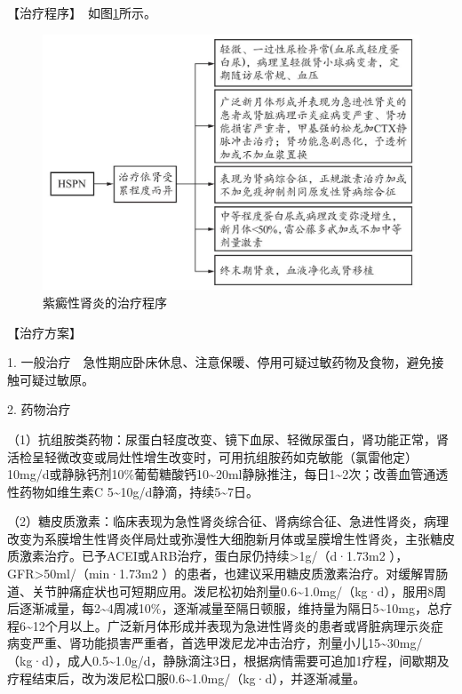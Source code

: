 【治疗程序】　如图\ref{fig4-2-2}所示。

\begin{figure}[!htbp]
 \centering
 \includegraphics{./images/Image00126.jpg}
 \captionsetup{justification=centering}
 \caption{紫癜性肾炎的治疗程序}
 \label{fig4-2-2}
  \end{figure} 

【治疗方案】

1.
一般治疗　急性期应卧床休息、注意保暖、停用可疑过敏药物及食物，避免接触可疑过敏原。

2. 药物治疗

（1）抗组胺类药物：尿蛋白轻度改变、镜下血尿、轻微尿蛋白，肾功能正常，肾活检呈轻微改变或局灶性增生改变时，可用抗组胺药如克敏能（氯雷他定）10mg/d或静脉钙剂10\%葡萄糖酸钙10\textasciitilde{}20ml静脉推注，每日1\textasciitilde{}2次；改善血管通透性药物如维生素C
5\textasciitilde{}10g/d静滴，持续5\textasciitilde{}7日。

（2）糖皮质激素：临床表现为急性肾炎综合征、肾病综合征、急进性肾炎，病理改变为系膜增生性肾炎伴局灶或弥漫性大细胞新月体或呈膜增生性肾炎，主张糖皮质激素治疗。已予ACEI或ARB治疗，蛋白尿仍持续\textgreater{}1g/（d·1.73m{2}
），GFR\textgreater{}50ml/（min·1.73m{2}
）的患者，也建议采用糖皮质激素治疗。对缓解胃肠道、关节肿痛症状也可短期应用。泼尼松初始剂量0.6\textasciitilde{}1.0mg/（kg·d），服用8周后逐渐减量，每2\textasciitilde{}4周减10\%，逐渐减量至隔日顿服，维持量为隔日5\textasciitilde{}10mg，总疗程6\textasciitilde{}12个月以上。广泛新月体形成并表现为急进性肾炎的患者或肾脏病理示炎症病变严重、肾功能损害严重者，首选甲泼尼龙冲击治疗，剂量小儿15\textasciitilde{}30mg/（kg·d），成人0.5\textasciitilde{}1.0g/d，静脉滴注3日，根据病情需要可追加1疗程，间歇期及疗程结束后，改为泼尼松口服0.6\textasciitilde{}1.0mg/（kg·d），并逐渐减量。

